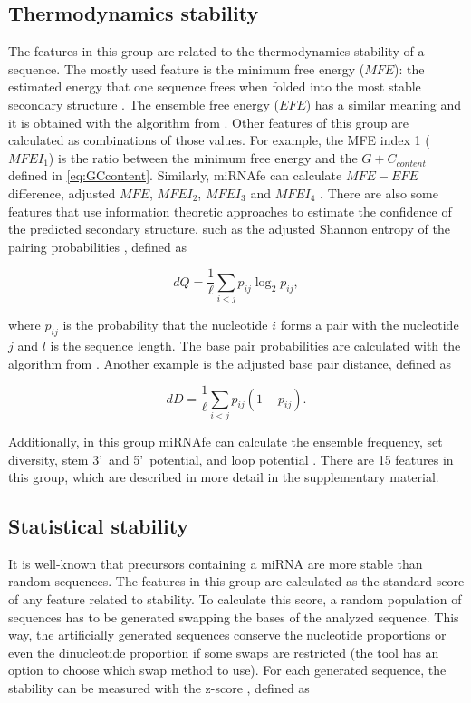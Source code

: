 \documentclass{article}
\begin{document}
\subsection{Thermodynamics stability}
The features in this group are related to the thermodynamics stability of a sequence. The mostly used feature is the minimum free energy ($MFE$): the estimated
energy that one sequence frees when folded into the most stable secondary structure \citep{Zuker81}. The ensemble free energy ($EFE$) has a similar meaning and
it is obtained with the algorithm from \cite{McCaskill90}. Other features of this group are calculated as combinations of those values. For example, the MFE
index 1 ($MFEI_{1}$) is the ratio between the minimum free energy and the ${G+C}_{content}$ defined in \ref{eq:GCcontent}. Similarly, miRNAfe can calculate
$MFE-EFE$ difference, adjusted $MFE$, $MFEI_{2}$, $MFEI_{3}$ and $MFEI_{4}$ \citep{Rukshan09}. There are also some features that use information theoretic
approaches to estimate the confidence of the predicted secondary structure, such as the adjusted Shannon entropy of the pairing probabilities \citep{Ng07},
defined as

\begin{equation}
\label{eq:dQ}
 dQ = \frac{1}{\ell} \sum_{i<j} p_{ij} \log_2 p_{ij} ,
\end{equation}

\noindent where $p_{ij}$ is the probability that the nucleotide $i$ forms a pair with the nucleotide $j$ and $l$ is the sequence length. The base pair
probabilities are calculated with the algorithm from \cite{McCaskill90}. Another example is the adjusted base pair distance, defined as

\begin{equation}
\label{eq:dD}
 dD = \frac{1}{\ell} \sum_{i<j} p_{ij} (1 - p_{ij}).
\end{equation}

Additionally, in this group miRNAfe can calculate the ensemble frequency, set diversity, stem 3\textquoteright~and 5\textquoteright~potential, and loop
potential \citep{Terai07}. There are 15 features in this group, which are described in more detail in the supplementary material.

\subsection{Statistical stability}
It is well-known that precursors containing a miRNA are more stable than random sequences. The features in this group are calculated as the standard score of
any feature related to stability. To calculate this score, a random population of sequences has to be generated swapping the bases of the analyzed sequence.
This way, the artificially generated sequences conserve the nucleotide proportions or even the dinucleotide proportion if some swaps are restricted (the tool
has an option to choose which swap method to use). For each generated sequence, the stability can be measured with the z-score \citep{Bonnet04}, defined as
\end{document}
